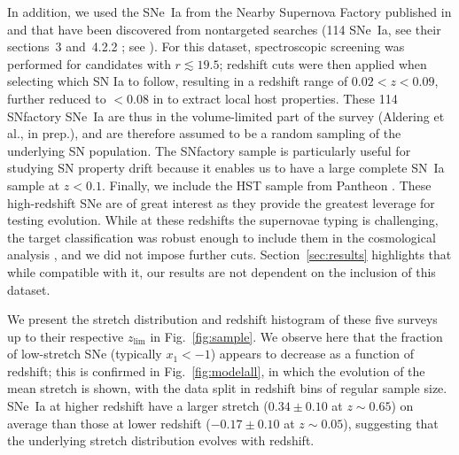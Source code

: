 \documentclass[]{aa}
\begin{document}
In addition, we used the SNe~Ia from the Nearby Supernova Factory
\citep[SNfactory,][]{aldering2002} published in \cite{rigault2020} and that have
been discovered from nontargeted searches (114 SNe~Ia, see their sections~3
and~4.2.2 ; see \citealt{aldering2020}). For this dataset, spectroscopic
screening was performed for candidates with $r \lesssim 19.5$; redshift cuts were
then applied when selecting which SN Ia to follow, resulting in a redshift range
of $0.02 < z < 0.09$, further reduced to $<0.08$ in \cite{rigault2020} to extract local host properties. These 114 SNfactory SNe~Ia are thus in the
volume-limited part of the survey (Aldering et al., in prep.), and are therefore
assumed to be a random sampling of the underlying SN population. The SNfactory
sample is particularly useful for studying SN property drift because it enables us
to have a large complete SN~Ia sample at $z<0.1$. Finally, we include the HST
sample from Pantheon \citep{strolger04}. These high-redshift SNe are of great
interest as they provide the greatest leverage for testing evolution. While at
these redshifts the supernovae typing is challenging, the target classification
was robust enough to include them in the cosmological analysis
\citep{scolnic2018a}, and we did not impose further cuts.
Section~\ref{sec:results} highlights that while compatible with it, our results
are not dependent on the inclusion of this dataset.

We present the stretch distribution and redshift histogram of these five surveys
up to their respective $z_{\lim}$ in Fig.~\ref{fig:sample}. We observe here that
the fraction of low-stretch SNe (typically $x_1 < -1$) appears to decrease as a
function of redshift; this is confirmed in Fig.~\ref{fig:modelall}, in which the
evolution of the mean stretch is shown, with the data split in redshift bins of
regular sample size. SNe~Ia at higher redshift have a
larger stretch ($0.34 \pm 0.10$ at $z\sim0.65$) on average than those at lower redshift
($-0.17\pm 0.10$ at $z\sim0.05$), suggesting that the underlying stretch
distribution evolves with redshift.
\end{document}
